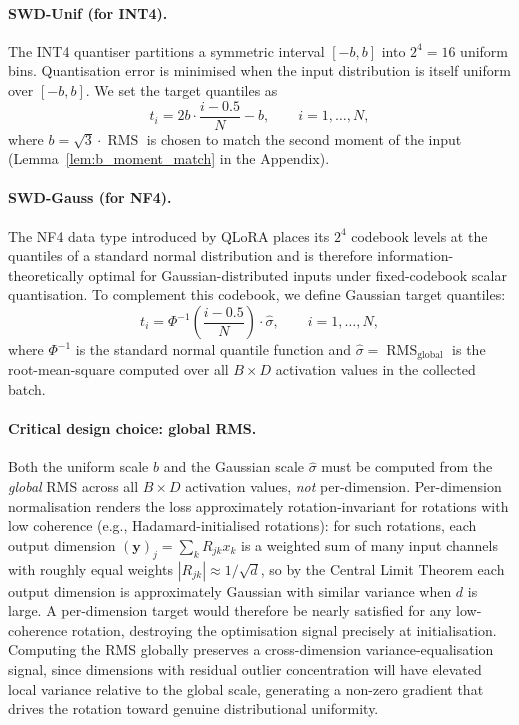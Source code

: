 \documentclass[11pt,a4paper]{article}
\DeclareMathOperator{\RMS}{RMS}
\newcommand{\by}{\mathbf{y}}
\begin{document}
\paragraph{SWD-Unif (for INT4).}
The INT4 quantiser partitions a symmetric interval $[-b, b]$ into $2^4 = 16$ uniform bins.
Quantisation error is minimised when the input distribution is itself uniform over $[-b, b]$.
We set the target quantiles as
\begin{equation}
\label{eq:target_unif}
t_i = 2b \cdot \frac{i - 0.5}{N} - b, \qquad i = 1, \ldots, N,
\end{equation}
where $b = \sqrt{3} \cdot \RMS$ is chosen to match the second moment of the input (Lemma~\ref{lem:b_moment_match} in the Appendix).

\paragraph{SWD-Gauss (for NF4).}
The NF4 data type introduced by QLoRA \cite{qlora} places its $2^4$ codebook levels at the quantiles of a standard normal distribution and is therefore information-theoretically optimal for Gaussian-distributed inputs under fixed-codebook scalar quantisation.
To complement this codebook, we define Gaussian target quantiles:
\begin{equation}
\label{eq:target_gauss}
t_i = \Phi^{-1}\!\left(\frac{i - 0.5}{N}\right) \cdot \hat{\sigma}, \qquad i = 1, \ldots, N,
\end{equation}
where $\Phi^{-1}$ is the standard normal quantile function and $\hat{\sigma} = \RMS_{\text{global}}$ is the root-mean-square computed over all $B \times D$ activation values in the collected batch.

\paragraph{Critical design choice: global RMS.}
\label{par:global_rms}
Both the uniform scale $b$ and the Gaussian scale $\hat{\sigma}$ must be computed from the \emph{global} RMS across all $B \times D$ activation values, \emph{not} per-dimension.
Per-dimension normalisation renders the loss approximately rotation-invariant for rotations with low coherence (e.g., Hadamard-initialised rotations): for such rotations, each output dimension $(\by)_j = \sum_k R_{jk} x_k$ is a weighted sum of many input channels with roughly equal weights $|R_{jk}| \approx 1/\sqrt{d}$, so by the Central Limit Theorem each output dimension is approximately Gaussian with similar variance when $d$ is large.
A per-dimension target would therefore be nearly satisfied for any low-coherence rotation, destroying the optimisation signal precisely at initialisation.
Computing the RMS globally preserves a cross-dimension variance-equalisation signal, since dimensions with residual outlier concentration will have elevated local variance relative to the global scale, generating a non-zero gradient that drives the rotation toward genuine distributional uniformity.
\end{document}
